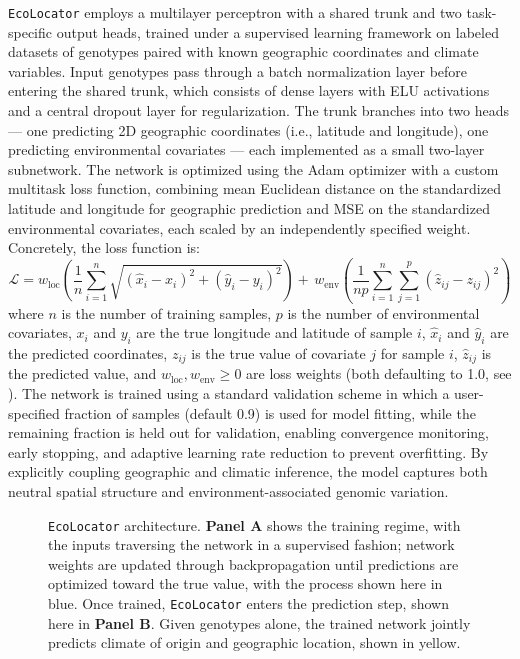 \documentclass[]{article}
\newcommand{\ecolocator}{\texttt{EcoLocator}\xspace}
\begin{document}
\ecolocator employs a multilayer perceptron with a shared trunk 
and two task-specific output heads, trained under a supervised 
learning framework on labeled datasets of genotypes paired with 
known geographic coordinates and climate variables. Input genotypes 
pass through a batch normalization layer before entering the shared 
trunk, which consists of dense layers with ELU activations and a 
central dropout layer for regularization. The trunk branches into 
two heads --- one predicting 2D geographic coordinates (i.e., latitude and longitude), one predicting 
environmental covariates --- each implemented as a small two-layer subnetwork. 
The network is optimized using the Adam optimizer with a custom multitask 
loss function, combining mean Euclidean distance on the standardized 
latitude and longitude for geographic 
prediction and MSE on the standardized environmental covariates, each scaled by an 
independently specified weight. Concretely, the loss function is:
\begin{equation} \label{eq:1}
    \mathcal{L} = w_{\text{loc}} \left( \frac{1}{n} \sum_{i=1}^{n}
    \sqrt{(\hat{x}_i - x_i)^2 + (\hat{y}_i - y_i)^2} \right)
    + \, w_{\text{env}} \left( \frac{1}{np} \sum_{i=1}^{n} \sum_{j=1}^{p}
    (\hat{z}_{ij} - z_{ij})^2 \right)
\end{equation}
where $n$ is the number of training samples, $p$ is the number of environmental
covariates, $x_i$ and $y_i$ are the true longitude and latitude of sample $i$,
$\hat{x}_i$ and $\hat{y}_i$ are the predicted coordinates, $z_{ij}$ is the true
value of covariate $j$ for sample $i$, $\hat{z}_{ij}$ is the predicted value,
and $w_{\text{loc}}, w_{\text{env}} \geq 0$ are loss
weights (both defaulting to 1.0, see ).
The network is trained using a standard validation scheme in which a user-specified 
fraction of samples (default 0.9) is used for model fitting, while the remaining fraction is 
held out for validation, enabling convergence monitoring, early stopping, 
and adaptive learning rate reduction to prevent overfitting. 
By explicitly coupling geographic and climatic inference, the model captures 
both neutral spatial structure and environment-associated genomic variation.


\begin{figure}[H]
    \caption{\ecolocator architecture. \textbf{Panel A} shows the training regime,
    with the inputs traversing the network in a supervised fashion; network weights 
    are updated through backpropagation until predictions are optimized toward the
    true value, with the process shown here in blue. Once trained, \ecolocator enters the prediction
    step, shown here in \textbf{Panel B}. Given genotypes alone, the trained network
    jointly predicts climate of origin and geographic location, shown in yellow. }
    \label{fig:architecture}
\end{figure}
\end{document}
